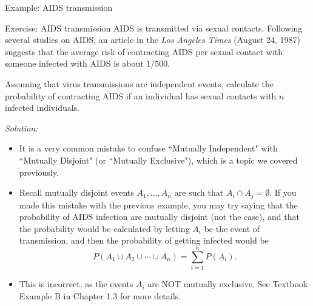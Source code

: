 \begin{frame}[allowframebreaks]{Example: AIDS transmission}

  \begin{exampleblock}{Exercise: AIDS transmission}
    AIDS is transmitted via sexual contacts. Following several studies on AIDS, an article in the \emph{Los Angeles Times} (August 24, 1987) suggests that the average risk of contracting AIDS per sexual contact with someone infected with AIDS is about $1/500$.

    Assuming that virus transmissions are independent events, calculate the probability of contracting AIDS if an individual has sexual contacts with $n$ infected individuals.
  \end{exampleblock}

  \emph{Solution:}


  \framebreak

    \begin{itemize}
      \item It is a very common mistake to confuse ``Mutually Independent" with ``Mutually Disjoint" (or ``Mutually Exclusive"), which is a topic we covered previously.

      \item Recall mutually disjoint events $A_1, \ldots, A_n$ are such that $A_i \cap A_j = \emptyset$. If you made this mistake with the previous example, you may try saying that the probability of AIDS infection are mutually disjoint (not the case), and that the probability would be calculated by letting $A_i$ be the event of transmission, and then the probability of getting infected would be
    $$
    P(A_1 \cup A_2 \cup \cdots \cup A_n) = \sum_{i = 1}^n P(A_i).
    $$
  \item This is incorrect, as the events $A_i$ are NOT mutually exclusive. See Textbook Example B in Chapter 1.3 for more details.
  \end{itemize}


\end{frame}
